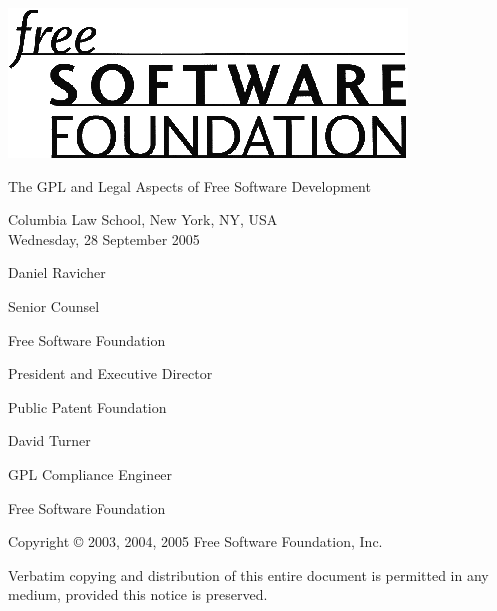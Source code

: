 \documentclass[11pt, letterpaper]{book}
\begin{document}
\frontmatter

\begin{titlepage}

\begin{center}

\vfill

\includegraphics{fsf-logo.eps}

\vfill

{\Large
{\sc The GPL and Legal Aspects of Free Software Development } \\

\vfill





Columbia Law School, New York, NY, USA \\
\vspace{.1in}
Wednesday, 28 September 2005
}

\vfill

{\large
Daniel Ravicher

Senior Counsel 

Free Software Foundation

President and Executive Director

Public Patent Foundation
}

\vspace{.3in}


{\large
David Turner

GPL Compliance Engineer

Free Software Foundation
}

\end{center}

\vfill

{\parindent 0in
Copyright \copyright{} 2003, 2004, 2005 \hspace{.2in} Free Software Foundation, Inc.

\vspace{.3in}

Verbatim copying and distribution of this entire document is permitted in
any medium, provided this notice is preserved.
}

\end{titlepage}
\end{document}
